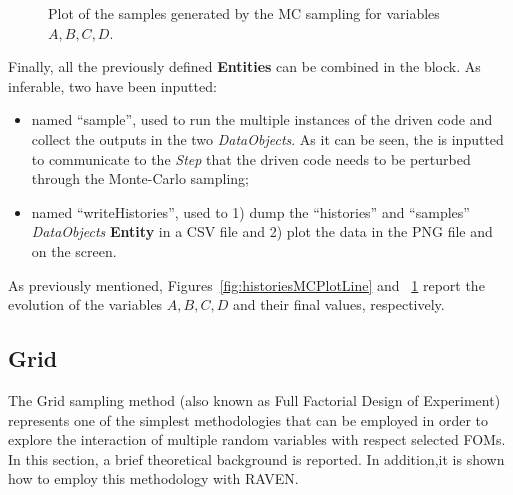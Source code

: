 \begin{enumerate}
\begin{figure}[h!]
  \caption{Plot of the samples generated by the MC sampling for variables $A,B,C,D$.}
  \label{fig:samplesMCPlotLine}
 \end{figure}
   Finally, all the previously defined \textbf{Entities} can be combined in 
   the  block. As inferable, 
   two  have been inputted:
   \begin{itemize}
     \item {} named ``sample'', used to run the multiple  
     instances of the driven code and 
     collect the outputs in the two \textit{DataObjects}. As it can be
     seen, the  is inputted to communicate to the 
     \textit{Step} that the driven code needs to
     be perturbed through the Monte-Carlo sampling;
     \item  {} named ``writeHistories'', used to 1) dump 
     the ``histories'' and ``samples'' \textit{DataObjects} 
     \textbf{Entity} in a CSV file and 2) plot the data in the PNG file and 
     on the screen.
   \end{itemize}
\end{enumerate} 
 As previously mentioned, Figures~\ref{fig:historiesMCPlotLine} and ~\ref{fig:samplesMCPlotLine}  report the evolution of the 
 variables $A,B,C,D$ and their final values, respectively.
\subsection{Grid}
\label{sub:Grid}
The Grid sampling method (also known as Full Factorial Design of Experiment) represents one of the simplest methodologies that can be employed in order to explore the interaction of multiple random variables with respect
selected FOMs.
In this section, a brief theoretical 
background is reported. In addition,it is shown how to employ this methodology with RAVEN.
